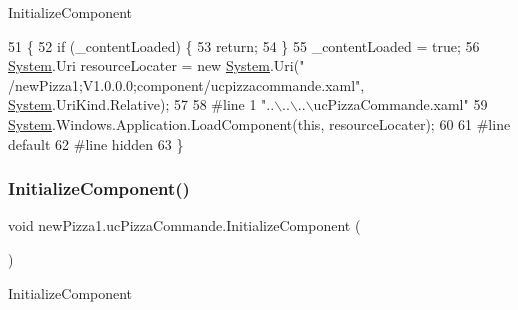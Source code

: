 Initialize\+Component 


\begin{DoxyCode}
51                                           \{
52             \textcolor{keywordflow}{if} (\_contentLoaded) \{
53                 \textcolor{keywordflow}{return};
54             \}
55             \_contentLoaded = \textcolor{keyword}{true};
56             \hyperlink{namespaceSystem}{System}.Uri resourceLocater = \textcolor{keyword}{new} \hyperlink{namespaceSystem}{System}.Uri(\textcolor{stringliteral}{"
      /newPizza1;V1.0.0.0;component/ucpizzacommande.xaml"}, \hyperlink{namespaceSystem}{System}.UriKind.Relative);
57             
58 \textcolor{preprocessor}{            #line 1 "..\(\backslash\)..\(\backslash\)..\(\backslash\)ucPizzaCommande.xaml"}
59             \hyperlink{namespaceSystem}{System}.Windows.Application.LoadComponent(\textcolor{keyword}{this}, resourceLocater);
60             
61 \textcolor{preprocessor}{            #line default}
62 \textcolor{preprocessor}{            #line hidden}
63         \}
\end{DoxyCode}
\mbox{\label{classnewPizza1_1_1ucPizzaCommande_a64b08961b7d2239fe9cf481dad628572}} 
\subsubsection{\texorpdfstring{Initialize\+Component()}{InitializeComponent()}\hspace{0.1cm}{\footnotesize\ttfamily [2/4]}}
{\footnotesize\ttfamily void new\+Pizza1.\+uc\+Pizza\+Commande.\+Initialize\+Component (\begin{DoxyParamCaption}{ }\end{DoxyParamCaption})\hspace{0.3cm}{\ttfamily [inline]}}



Initialize\+Component 


